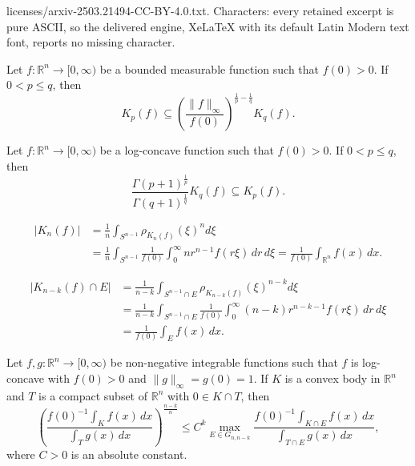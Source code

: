 \documentclass[10pt,a4paper]{amsart}
\newcommand{\ls}{\leqslant}
\begin{document}
licenses/arxiv-2503.21494-CC-BY-4.0.txt. Characters: every retained excerpt is pure ASCII, so the delivered engine, XeLaTeX with its default Latin Modern text font, reports no missing character.
\begin{lemma}\label{lem:any-g}
Let $f:\mathbb R^n\to [0,\infty)$ be a bounded measurable function such that $f(0)>0$. If $0 < p\ls q$, then
\begin{equation}\label{any-g}K_{p}(f)\subseteq
\left(\frac{\|f\|_{\infty}}{f(0)}\right)^{\frac{1}{p}-\frac{1}{q}}K_{q}(f).
\end{equation}
\end{lemma}

\begin{lemma}\label{lem:log-concave-f}
Let $f:\mathbb R^n\to [0,\infty)$ be a log-concave function such
that $f(0)>0$. If $0 < p\ls q$, then
\begin{equation}\label{log-concave-f} \frac{\Gamma(p+1)^{\frac{1}{p}}}{\Gamma(q+1)^{\frac{1}{q}}} K_q(f)\subseteq
K_{p}(f).\end{equation}
\end{lemma}

\begin{align}\label{eq:quotient-1}
|K_n(f)| &=\frac{1}{n}\int_{S^{n-1}}\rho_{K_n(f)}(\xi)^nd\xi\\
\nonumber &=\frac{1}{n}\int_{S^{n-1}}\frac{1}{f(0)}\int_0^{\infty}nr^{n-1}f(r\xi)\,dr\,d\xi
=\frac{1}{f(0)}\int_{{\mathbb R}^n}f(x)\,dx.
\end{align}

\begin{align}\label{eq:quotient-2}
|K_{n-k}(f)\cap E| &=\frac{1}{n-k}\int_{S^{n-1}\cap E}
\rho_{K_{n-k}(f)}(\xi)^{n-k}d\xi\\
\nonumber &=\frac{1}{n-k}\int_{S^{n-1}\cap E}\frac{1}{f(0)}\int_0^{\infty}(n-k)r^{n-k-1}f(r\xi)\,dr\,d\xi \\
\nonumber &=\frac{1}{f(0)}\int_Ef(x)\,dx.
\end{align}

\begin{theorem}\label{th:quotient}Let $f,g:{\mathbb R}^n\to [0,\infty)$ be non-negative integrable functions such that
$f$ is log-concave with $f(0)>0$ and $\|g\|_\infty=g(0)=1$.
If $K$ is a convex body in ${\mathbb R}^n$ and $T$ is a compact subset of ${\mathbb R}^n$ with $0\in K\cap T$, then
\begin{equation}\label{eq:quotient}
\left(\frac{f(0)^{-1}\int_Kf(x)\,dx}{\int_T g(x)\,dx}\right)^{\frac{n-k}{n}}  \ls C^k
\max_{E\in G_{n,n-k}} \frac{f(0)^{-1}\int_{K\cap E} f(x)\,dx}{\int_{T\cap E} g(x)\,dx},
\end{equation}
where $C>0$ is an absolute constant.
\end{theorem}
\end{document}
